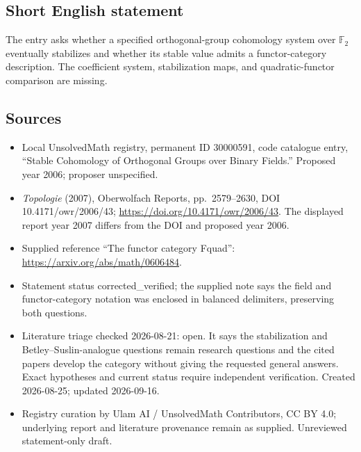 \documentclass[11pt]{article}
\newcommand{\F}{\mathbb{F}}
\begin{document}
\subsection{Short English statement}
The entry asks whether a specified orthogonal-group cohomology system over $\F_2$ eventually stabilizes and whether its stable value admits a functor-category description. The coefficient system, stabilization maps, and quadratic-functor comparison are missing.
\subsection{Sources}
\begin{itemize}
\item Local UnsolvedMath registry, permanent ID 30000591, code catalogue entry, ``Stable Cohomology of Orthogonal Groups over Binary Fields.'' Proposed year 2006; proposer unspecified.
\item \emph{Topologie} (2007), Oberwolfach Reports, pp.\ 2579--2630, DOI 10.4171/owr/2006/43; \url{https://doi.org/10.4171/owr/2006/43}. The displayed report year 2007 differs from the DOI and proposed year 2006.
\item Supplied reference ``The functor category Fquad'': \url{https://arxiv.org/abs/math/0606484}.
\item Statement status corrected\_verified; the supplied note says the field and functor-category notation was enclosed in balanced delimiters, preserving both questions.
\item Literature triage checked 2026-08-21: open. It says the stabilization and Betley--Suslin-analogue questions remain research questions and the cited papers develop the category without giving the requested general answers. Exact hypotheses and current status require independent verification. Created 2026-08-25; updated 2026-09-16.
\item Registry curation by Ulam AI / UnsolvedMath Contributors, CC BY 4.0; underlying report and literature provenance remain as supplied. Unreviewed statement-only draft.
\end{itemize}
\end{document}
